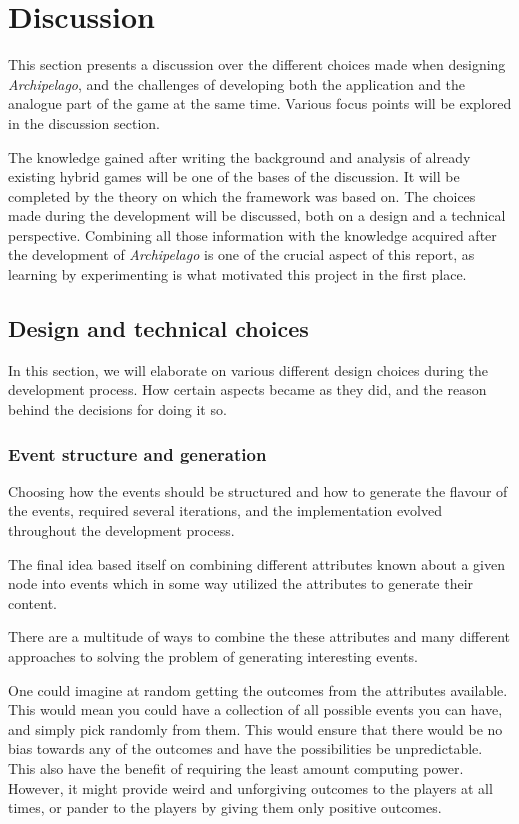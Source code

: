 \chapter{Discussion}
\label{sec:disc}
This section presents a discussion over the different choices made when designing \textit{Archipelago}, and the challenges of developing both the application and the analogue part of the game at the same time. Various focus points will be explored in the discussion section. 

The knowledge gained after writing the background and analysis of already existing hybrid games will be one of the bases of the discussion. It will be completed by the theory on which the framework was based on. The choices made during the development will be discussed, both on a design and a technical perspective. Combining all those information with the knowledge acquired after the development of \textit{Archipelago} is one of the crucial aspect of this report, as learning by experimenting is what motivated this project in the first place.

\section{Design and technical choices} 
In this section, we will elaborate on various different design choices during the development process. How certain aspects became as they did, and the reason behind the decisions for doing it so.

\subsection{Event structure and generation}
Choosing how the events should be structured and how to generate the flavour of the events, required several iterations, and the implementation evolved throughout the development process.

The final idea based itself on combining different attributes known about a given node into events which in some way utilized the attributes to generate their content. 

There are a multitude of ways to combine the these attributes and many different approaches to solving the problem of generating interesting events.

One could imagine at random getting the outcomes from the attributes available. 
This would mean you could have a collection of all possible events you can have, and simply pick randomly from them. 
This would ensure that there would be no bias towards any of the outcomes and have the possibilities be unpredictable. This also have the benefit of requiring the least amount computing power. 
However, it might provide weird and unforgiving outcomes to the players at all times, or pander to the players by giving them only positive outcomes.

